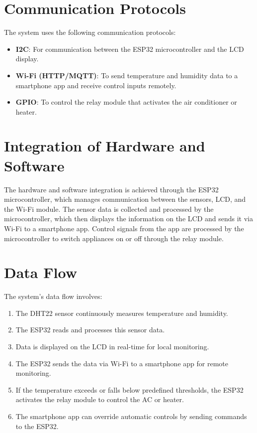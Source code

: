 \documentclass[a4paper,12pt]{article}
\begin{document}
\section{Communication Protocols}
The system uses the following communication protocols:
\begin{itemize}
    \item \textbf{I2C}: For communication between the ESP32 microcontroller and the LCD display.
    \item \textbf{Wi-Fi (HTTP/MQTT)}: To send temperature and humidity data to a smartphone app and receive control inputs remotely.
    \item \textbf{GPIO}: To control the relay module that activates the air conditioner or heater.
\end{itemize}

\section{Integration of Hardware and Software}
The hardware and software integration is achieved through the ESP32 microcontroller, which manages communication between the sensors, LCD, and the Wi-Fi module. The sensor data is collected and processed by the microcontroller, which then displays the information on the LCD and sends it via Wi-Fi to a smartphone app. Control signals from the app are processed by the microcontroller to switch appliances on or off through the relay module.

\section{Data Flow}
The system’s data flow involves:
\begin{enumerate}
    \item The DHT22 sensor continuously measures temperature and humidity.
    \item The ESP32 reads and processes this sensor data.
    \item Data is displayed on the LCD in real-time for local monitoring.
    \item The ESP32 sends the data via Wi-Fi to a smartphone app for remote monitoring.
    \item If the temperature exceeds or falls below predefined thresholds, the ESP32 activates the relay module to control the AC or heater.
    \item The smartphone app can override automatic controls by sending commands to the ESP32.
\end{enumerate}
\end{document}
